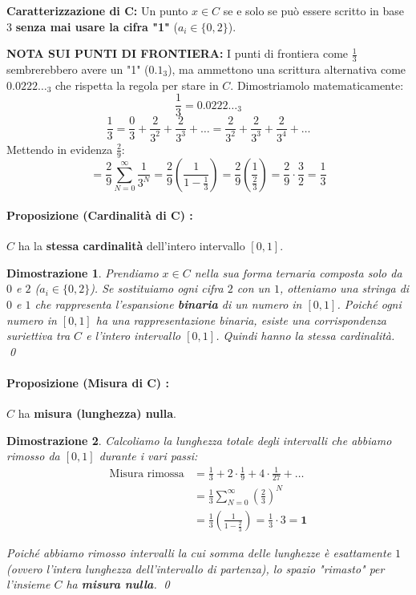 \documentclass[openany]{book}
\newtheorem*{dimostrazione}{Dimostrazione}
\theoremstyle{definition}
\theoremstyle{remark}
\begin{document}
\textbf{Caratterizzazione di C:} Un punto $x \in C$ se e solo se può essere scritto in base 3 \textbf{senza mai usare la cifra "1"} ($a_i \in \{0, 2\}$).

\vspace{1em}
\textbf{NOTA SUI PUNTI DI FRONTIERA:}
I punti di frontiera come $\frac{1}{3}$ sembrerebbero avere un "1" ($0.1_3$), ma ammettono una scrittura alternativa come $0.0222\dots_3$ che rispetta la regola per stare in $C$.
Dimostriamolo matematicamente:
$$ \frac{1}{3} = 0.0222\dots_3 $$
$$ \frac{1}{3} = \frac{0}{3} + \frac{2}{3^2} + \frac{2}{3^3} + \dots = \frac{2}{3^2} + \frac{2}{3^3} + \frac{2}{3^4} + \dots $$
Mettendo in evidenza $\frac{2}{9}$:
$$ = \frac{2}{9} \sum_{N=0}^{\infty} \frac{1}{3^N} = \frac{2}{9} \left( \frac{1}{1 - \frac{1}{3}} \right) = \frac{2}{9} \left( \frac{1}{\frac{2}{3}} \right) = \frac{2}{9} \cdot \frac{3}{2} = \frac{1}{3} $$

\vspace{1.5em}
\paragraph{Proposizione (Cardinalità di C) :}
$C$ ha la \textbf{stessa cardinalità} dell'intero intervallo $[0, 1]$.


\begin{dimostrazione}
Prendiamo $x \in C$ nella sua forma ternaria composta solo da $0$ e $2$ ($a_i \in \{0, 2\}$).
Se sostituiamo ogni cifra $2$ con un $1$, otteniamo una stringa di $0$ e $1$ che rappresenta l'espansione \textbf{binaria} di un numero in $[0, 1]$.
Poiché \emph{ogni} numero in $[0, 1]$ ha una rappresentazione binaria, esiste una corrispondenza suriettiva tra $C$ e l'intero intervallo $[0, 1]$. Quindi hanno la stessa cardinalità. \qed
\end{dimostrazione}

\vspace{1.5em}
\paragraph{Proposizione (Misura di C) :}
$C$ ha \textbf{misura (lunghezza) nulla}.

\begin{dimostrazione}
Calcoliamo la lunghezza totale degli intervalli che abbiamo rimosso da $[0, 1]$ durante i vari passi:
\begin{align*}
    \text{Misura rimossa} &= \frac{1}{3} + 2 \cdot \frac{1}{9} + 4 \cdot \frac{1}{27} + \dots \\
    &= \frac{1}{3} \sum_{N=0}^{\infty} \left( \frac{2}{3} \right)^N \\
    &= \frac{1}{3} \left( \frac{1}{1 - \frac{2}{3}} \right) = \frac{1}{3} \cdot 3 = \mathbf{1}
\end{align*}

Poiché abbiamo rimosso intervalli la cui somma delle lunghezze è esattamente $1$ (ovvero l'intera lunghezza dell'intervallo di partenza), lo spazio "rimasto" per l'insieme $C$ ha \textbf{misura nulla}. \qed
\end{dimostrazione}
\end{document}
